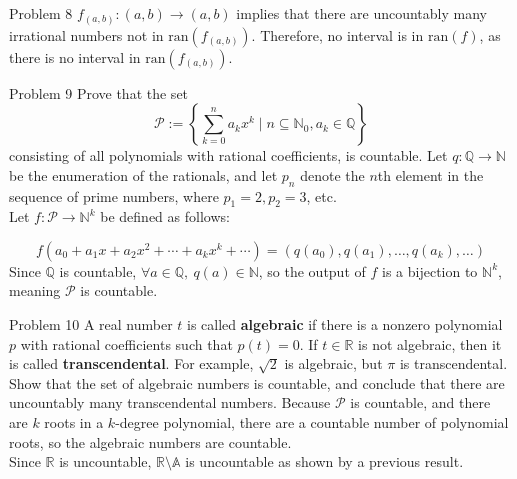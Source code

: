 \documentclass[10pt]{extarticle}
\begin{document}
{\begin{problem}{Problem 8}
    $f_{(a,b)}: (a,b) \rightarrow (a,b)$ implies that there are uncountably many irrational numbers not in $\textrm{ran}(f_{(a,b)})$. Therefore, no interval is in $\textrm{ran}(f)$, as there is no interval in $\textrm{ran}(f_{(a,b)})$.
  \end{problem}
  \begin{problem}{Problem 9}
    Prove that the set
    \[
      \mathcal{P} := \left\{\sum_{k=0}^{n}a_kx^k \mid n\subseteq \mathbb{N}_0,a_k\in\mathbb{Q}\right\}
    \] 
    consisting of all polynomials with rational coefficients, is countable.
    \tcblower
    Let $q: \mathbb{Q} \rightarrow \mathbb{N}$ be the enumeration of the rationals, and let $p_n$ denote the $n$th element in the sequence of prime numbers, where $p_1 = 2, p_2 = 3$, etc.\\

    Let $f: \mathcal{P} \rightarrow \mathbb{N}^k$ be defined as follows:

    \[
      f(a_0 + a_1x + a_2x^2 + \cdots + a_kx^k + \cdots) = (q(a_0),q(a_1),\dots,q(a_k),\dots)
    \] 
    Since $\mathbb{Q}$ is countable, $\forall a\in \mathbb{Q},~q(a)\in \mathbb{N}$, so the output of $f$ is a bijection to $\mathbb{N}^k$, meaning $\mathcal{P}$ is countable.
  \end{problem}
  \begin{problem}{Problem 10}
    A real number $t$ is called \textbf{algebraic} if there is a nonzero polynomial $p$ with rational coefficients such that $p(t) = 0$. If $t\in \mathbb{R}$ is not algebraic, then it is called \textbf{transcendental}. For example, $\sqrt{2}$ is algebraic, but $\pi$ is transcendental. Show that the set of algebraic numbers is countable, and conclude that there are uncountably many transcendental numbers.
    \tcblower
    Because $\mathcal{P}$ is countable, and there are $k$ roots in a $k$-degree polynomial, there are a countable number of polynomial roots, so the algebraic numbers are countable.\\

    Since $\mathbb{R}$ is uncountable, $\mathbb{R}\setminus\mathbb{A}$ is uncountable as shown by a previous result.
  \end{problem}
}
\end{document}
